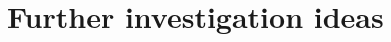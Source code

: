 \chapter{Further investigation ideas }
\label{chap:FutherIdeas}
\begin{comment}
•	Continuous measurements close to the water body. Located downwind.
•	Methane emission to the atmosphere measurements using the funnel method.
•	Continuous methane concentration measurements in the water
•	Soil investigation from the port regions.
\end{comment}